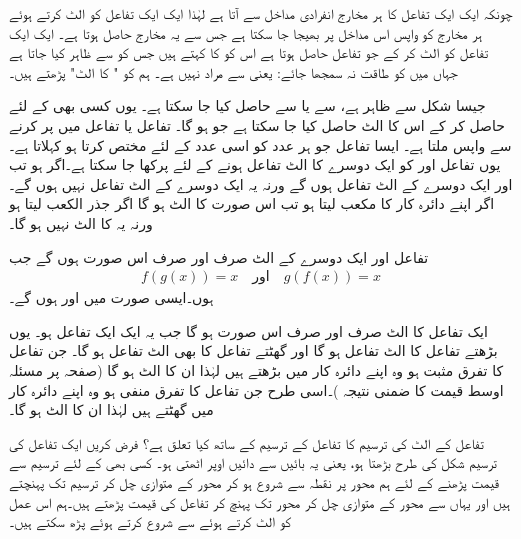 چونکہ ایک ایک تفاعل کا ہر مخارج  انفرادی مداخل  سے آتا ہے لہٰذا ایک ایک تفاعل کو الٹ کرتے ہوئے ہر مخارج کو واپس اس مداخل پر بھیجا جا سکتا ہے جس سے یہ مخارج حاصل ہوتا ہے۔ ایک ایک تفاعل  کو الٹ کر کے جو تفاعل حاصل ہوتا ہے اس کو  کا  کہتے ہیں جس کو  سے ظاہر کیا جاتا ہے جہاں  میں  کو طاقت نہ سمجھا جائے: یعنی  سے مراد  نہیں ہے۔ ہم  کو " کا الٹ" پڑھتے ہیں۔

جیسا شکل سے ظاہر ہے،  سے  یا  سے  حاصل کیا جا سکتا ہے۔ یوں کسی بھی  کے لئے  حاصل کر کے اس  کا الٹ  حاصل کیا جا سکتا ہے جو  ہو گا۔ تفاعل  یا تفاعل  میں  پر کرنے سے واپس  ملتا ہے۔ ایسا تفاعل جو ہر عدد کو اسی عدد کے لئے مختص کرتا ہو   کہلاتا ہے۔ یوں تفاعل  اور  کو ایک دوسرے  کا الٹ تفاعل ہونے کے لئے پرکھا جا سکتا ہے۔اگر  ہو تب  اور  ایک دوسرے کے الٹ تفاعل ہوں گے ورنہ یہ ایک دوسرے کے الٹ تفاعل نہیں ہوں گے۔ اگر  اپنے دائرہ کار کا مکعب لیتا ہو تب  اس صورت  کا الٹ ہو گا اگر  جذر الکعب لیتا ہو ورنہ یہ  کا الٹ نہیں ہو گا۔

تفاعل  اور  ایک دوسرے کے الٹ صرف اور صرف اس صورت ہوں گے جب
\begin{align*}
f(g(x))=x\quad \text{اور}\quad g(f(x))=x
\end{align*}
ہوں۔ایسی صورت میں  اور  ہوں گے۔

ایک تفاعل کا الٹ صرف اور صرف اس صورت ہو گا جب یہ ایک ایک تفاعل ہو۔ یوں بڑھتے تفاعل کا الٹ تفاعل ہو گا اور  گھٹتے تفاعل کا بھی الٹ تفاعل ہو گا۔ جن تفاعل کا تفرق مثبت ہو وہ اپنے دائرہ کار میں بڑھتے ہیں لہٰذا ان کا الٹ ہو گا (صفحہ  پر مسئلہ اوسط قیمت کا ضمنی نتیجہ )۔اسی طرح جن تفاعل کا تفرق منفی ہو وہ اپنے دائرہ کار میں گھٹتے ہیں لہٰذا ان کا الٹ ہو گا۔

تفاعل کے الٹ کی ترسیم کا تفاعل کے ترسیم کے ساتھ کیا تعلق ہے؟ فرض کریں ایک تفاعل کی ترسیم شکل کی طرح  بڑھتا ہو، یعنی یہ بائیں سے دائیں اوپر اٹھتی  ہو۔ کسی بھی  کے لئے ترسیم سے قیمت پڑھنے کے لئے ہم محور  پر نقطہ  سے شروع ہو کر محور  کے متوازی چل کر ترسیم تک پہنچتے ہیں اور یہاں سے محور  کے متوازی چل کر محور  تک پہنچ کر تفاعل کی قیمت  پڑھتے ہیں۔ہم اس عمل کو الٹ کرتے ہوئے  سے شروع کرتے ہوئے  پڑھ سکتے ہیں۔

